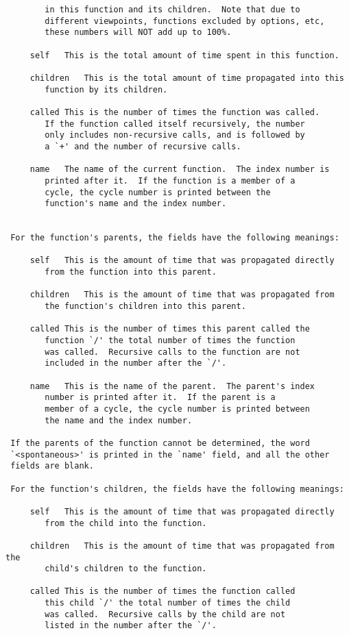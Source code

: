 \begin{lstlisting}[breaklines=true]
     % time	This is the percentage of the `total' time that was spent
		in this function and its children.  Note that due to
		different viewpoints, functions excluded by options, etc,
		these numbers will NOT add up to 100%.

     self	This is the total amount of time spent in this function.

     children	This is the total amount of time propagated into this
		function by its children.

     called	This is the number of times the function was called.
		If the function called itself recursively, the number
		only includes non-recursive calls, and is followed by
		a `+' and the number of recursive calls.

     name	The name of the current function.  The index number is
		printed after it.  If the function is a member of a
		cycle, the cycle number is printed between the
		function's name and the index number.


 For the function's parents, the fields have the following meanings:

     self	This is the amount of time that was propagated directly
		from the function into this parent.

     children	This is the amount of time that was propagated from
		the function's children into this parent.

     called	This is the number of times this parent called the
		function `/' the total number of times the function
		was called.  Recursive calls to the function are not
		included in the number after the `/'.

     name	This is the name of the parent.  The parent's index
		number is printed after it.  If the parent is a
		member of a cycle, the cycle number is printed between
		the name and the index number.

 If the parents of the function cannot be determined, the word
 `<spontaneous>' is printed in the `name' field, and all the other
 fields are blank.

 For the function's children, the fields have the following meanings:

     self	This is the amount of time that was propagated directly
		from the child into the function.

     children	This is the amount of time that was propagated from the
		child's children to the function.

     called	This is the number of times the function called
		this child `/' the total number of times the child
		was called.  Recursive calls by the child are not
		listed in the number after the `/'.


\end{lstlisting}
